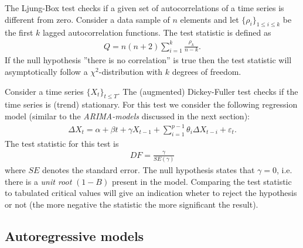 	\begin{method}
		The Ljung-Box test checks if a given set of autocorrelations of a time series is different from zero. Consider a data sample of $n$ elements and let $\{\rho_i\}_{1\leq i\leq k}$ be the first $k$ lagged autocorrelation functions. The test statistic is defined as
		\begin{gather}
			Q = n(n+2)\sum_{i=1}^k\frac{\rho_k}{n-k}.
		\end{gather}
		If the null hypothesis ''there is no correlation'' is true then the test statistic will asymptotically follow a $\chi^2$-distribution with $k$ degrees of freedom.
	\end{method}
	
	\begin{method}
		Consider a time series $\{X_t\}_{t\leq T}$. The (augmented) Dickey-Fuller test checks if the time series is (trend) stationary. For this test we consider the following regression model (similar to the \textit{ARIMA-models} discussed in the next section):
		\begin{gather}
			\Delta X_t = \alpha + \beta t + \gamma X_{t-1} + \sum_{i=1}^{p-1} \theta_i\Delta X_{t-i} + \varepsilon_t.
		\end{gather}
		The test statistic for this test is
		\begin{gather}
			DF = \frac{\gamma}{SE(\gamma)}
		\end{gather}
		where $SE$ denotes the standard error. The null hypothesis states that $\gamma=0$, i.e. there is a \textit{unit root} $(1-B)$ present in the model. Comparing the test statistic to tabulated critical values will give an indication wheter to reject the hypothesis or not (the more negative the statistic the more significant the result).
	\end{method}

\subsection{Autoregressive models}

	

